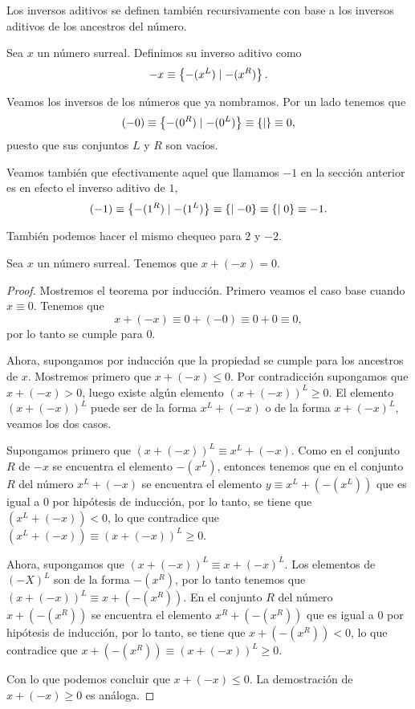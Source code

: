     Los inversos aditivos se definen tambi\'en recursivamente con base a los inversos aditivos de los ancestros del n\'umero.

    \begin{definition}
        Sea $x$ un n\'umero surreal. Definimos su inverso aditivo como
        \[
            -x \equiv \left\{-(x^L)\mid -(x^R)\right\}.
        \]
    \end{definition}

    \begin{example}
        Veamos los inversos de los n\'umeros que ya nombramos. Por un lado tenemos que
        \[
            (-0) \equiv \left\{-(0^R)\mid -(0^L)\right\} \equiv \left\{\mid \right\} \equiv 0,
        \]
        puesto que sus conjuntos $L$ y $R$ son vac\'ios.

        Veamos tambi\'en que efectivamente aquel que llamamos $-1$ en la secci\'on anterior es en efecto el inverso aditivo de $1$,
        \[
            (-1) \equiv \left\{-(1^R)\mid -(1^L)\right\} \equiv \left\{\mid -0\right\} \equiv \left\{\mid 0\right\} \equiv -1.     
        \]

        Tambi\'en podemos hacer el mismo chequeo para $2$ y $-2$.
    \end{example}

    \begin{theorem}
        Sea $x$ un n\'umero surreal. Tenemos que $x+(-x)=0$.
    \end{theorem}

    \begin{proof}
        Mostremos el teorema por inducci\'on. Primero veamos el caso base cuando $x\equiv 0$. Tenemos que
        \[
            x + (-x) \equiv 0 + (-0) \equiv 0+0 \equiv 0,
        \]
        por lo tanto se cumple para $0$.

        Ahora, supongamos por inducci\'on que la propiedad se cumple para los ancestros de $x$. Mostremos primero que $x + (-x) \le 0$. Por contradicci\'on supongamos que $x + (-x) > 0$, luego existe alg\'un elemento $(x + (-x))^L \ge 0$. El elemento $(x + (-x))^L$ puede ser de la forma $x^L + (-x)$ o de la forma $x + (-x)^L$, veamos los dos casos.

        Supongamos primero que $(x + (-x))^L \equiv x^L + (-x)$. Como en el conjunto $R$ de $-x$ se encuentra el elemento $-(x^L)$, entonces tenemos que en el conjunto $R$ del n\'umero $x^L + (-x)$ se encuentra el elemento $y \equiv x^L + (-(x^L))$ que es igual a $0$ por hip\'otesis de inducci\'on, por lo tanto, se tiene que $(x^L + (-x)) < 0$, lo que contradice que $(x^L + (-x))\equiv (x + (-x))^L \ge 0$.

        Ahora, supongamos que $(x + (-x))^L \equiv x + (-x)^L$. Los elementos de $(-X)^L$ son de la forma $-(x^R)$, por lo tanto tenemos que $(x + (-x))^L\equiv x + (-(x^R))$. En el conjunto $R$ del n\'umero $x + (-(x^R))$ se encuentra el elemento $x^R + (-(x^R))$ que es igual a $0$ por hip\'otesis de inducci\'on, por lo tanto, se tiene que $x + (-(x^R)) < 0$, lo que contradice que $x + (-(x^R))\equiv (x + (-x))^L \ge 0$.

        Con lo que podemos concluir que $x + (-x) \le 0$. La demostraci\'on de $x+(-x) \ge 0$ es an\'aloga.
    \end{proof}


